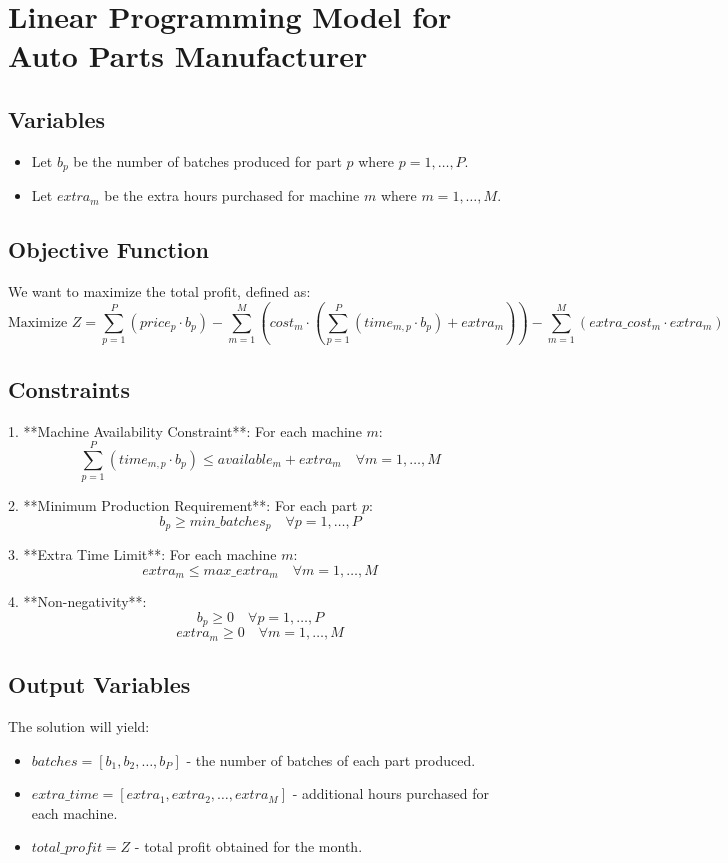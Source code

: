 \documentclass{article}
\begin{document}
\section*{Linear Programming Model for Auto Parts Manufacturer}

\subsection*{Variables}
\begin{itemize}
    \item Let \( b_p \) be the number of batches produced for part \( p \) where \( p = 1, \ldots, P \).
    \item Let \( extra_m \) be the extra hours purchased for machine \( m \) where \( m = 1, \ldots, M \).
\end{itemize}

\subsection*{Objective Function}
We want to maximize the total profit, defined as:
\[
\text{Maximize } Z = \sum_{p=1}^{P} (price_p \cdot b_p) - \sum_{m=1}^{M} (cost_m \cdot \left( \sum_{p=1}^{P} (time_{m,p} \cdot b_p) + extra_m \right)) - \sum_{m=1}^{M} (extra\_cost_m \cdot extra_m)
\]

\subsection*{Constraints}
1. **Machine Availability Constraint**:
   For each machine \( m \):
   \[
   \sum_{p=1}^{P} (time_{m,p} \cdot b_p) \leq available_m + extra_m \quad \forall m = 1, \ldots, M
   \]

2. **Minimum Production Requirement**:
   For each part \( p \):
   \[
   b_p \geq min\_batches_p \quad \forall p = 1, \ldots, P
   \]

3. **Extra Time Limit**:
   For each machine \( m \):
   \[
   extra_m \leq max\_extra_m \quad \forall m = 1, \ldots, M
   \]

4. **Non-negativity**:
   \[
   b_p \geq 0 \quad \forall p = 1, \ldots, P
   \]
   \[
   extra_m \geq 0 \quad \forall m = 1, \ldots, M
   \]

\subsection*{Output Variables}
The solution will yield:
\begin{itemize}
    \item \( batches = [b_1, b_2, \ldots, b_P] \) - the number of batches of each part produced.
    \item \( extra\_time = [extra_1, extra_2, \ldots, extra_M] \) - additional hours purchased for each machine.
    \item \( total\_profit = Z \) - total profit obtained for the month.
\end{itemize}
\end{document}
